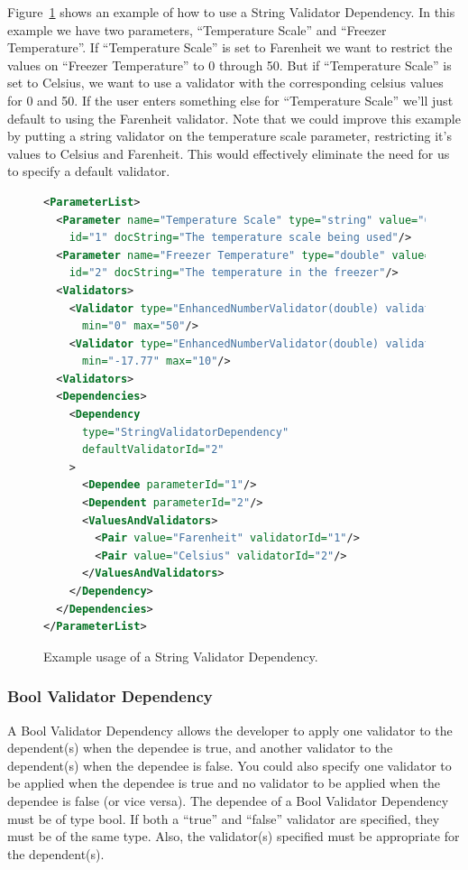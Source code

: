 Figure~\ref{StringValiDepXML} shows an example of how to use a String Validator Dependency. In this example we have two parameters, ``Temperature Scale''
and ``Freezer Temperature''. If ``Temperature Scale'' is set to Farenheit we want to restrict the values on ``Freezer Temperature'' to 0 through 50. But
if ``Temperature Scale'' is set to Celsius, we want to use a validator with the corresponding celsius values for 0 and 50. If the user enters something else
for ``Temperature Scale'' we'll just default to using the Farenheit validator.  Note that we could improve this example by putting a string validator on 
the temperature scale parameter, restricting it's values to Celsius and Farenheit.  This would effectively eliminate the need for us to specify a default 
validator.
\begin{figure}
  \centering
\begin{lstlisting}[language=XML]
<ParameterList>
  <Parameter name="Temperature Scale" type="string" value="Celsius"
    id="1" docString="The temperature scale being used"/>
  <Parameter name="Freezer Temperature" type="double" value="0"
    id="2" docString="The temperature in the freezer"/>
  <Validators>
    <Validator type="EnhancedNumberValidator(double) validatorId="1"
      min="0" max="50"/>
    <Validator type="EnhancedNumberValidator(double) validatorId="2"
      min="-17.77" max="10"/>
  <Validators>
  <Dependencies>
    <Dependency 
      type="StringValidatorDependency" 
      defaultValidatorId="2"
    >
      <Dependee parameterId="1"/>
      <Dependent parameterId="2"/>
      <ValuesAndValidators>
        <Pair value="Farenheit" validatorId="1"/>
        <Pair value="Celsius" validatorId="2"/>
      </ValuesAndValidators>
    </Dependency>
  </Dependencies>
</ParameterList>
  \end{lstlisting}
  \caption{Example usage of a String Validator Dependency.}
  \label{StringValiDepXML}
\end{figure}

\subsubsection{Bool Validator Dependency}
A Bool Validator Dependency allows the developer to apply one validator to the dependent(s) when the dependee is true, and another validator
to the dependent(s) when the dependee is false. You could also specify one validator to be applied when the dependee is true and no validator
to be applied when the dependee is false (or vice versa). The dependee of a Bool Validator Dependency must be of type bool. If both a ``true'' and
``false'' validator are specified, they must be of the same type. Also, the validator(s) specified must be appropriate for the dependent(s).


